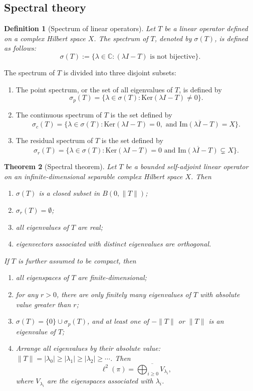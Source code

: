 \documentclass[a4]{amsart}
\newtheorem{theorem}{Theorem}
\newtheorem{definition}[theorem]{Definition}
\theoremstyle{remark} \newtheorem{remark}[theorem]{Remark}
\begin{document}
\subsection{Spectral theory}
\begin{definition}[Spectrum of linear operators]
Let $T$ be a linear operator defined on a complex Hilbert space $X$. The spectrum of $T$, denoted by $\sigma(T)$, is defined as follows:
\[
\sigma(T) := \{\lambda \in \mathbb{C} : (\lambda I - T) \text{ is not bijective}\}.
\]
\end{definition}
The spectrum of $T$ is divided into three disjoint subsets:
\begin{enumerate}
  \item[(a)] The point spectrum, or the set of all eigenvalues of $T$, is defined by
\[
\sigma_p(T)  = \{\lambda \in \sigma(T) : \mathrm{Ker}(\lambda I - T) \neq 0\}.
\]
  \item[(b)] The continuous spectrum of $T$ is the set defined by
\[
\sigma_c(T) = \{\lambda \in \sigma(T) : \mathrm{Ker}(\lambda I - T) = 0, \text{ and } \overline{\mathrm{Im}(\lambda I - T)} = X\}.
\]
  \item[(c)] The residual spectrum of $T$ is the set defined by
\[
\sigma_r(T) = \{\lambda \in \sigma(T) : \mathrm{Ker}(\lambda I - T) = 0 \text{ and } \overline{\mathrm{Im}(\lambda I - T)} \subsetneq X\}.
\]
\end{enumerate}

\begin{theorem}[Spectral theorem]
Let $T$ be a bounded self-adjoint linear operator on an infinite-dimensional separable complex Hilbert space $X$. Then
\begin{enumerate}
  \item [$(1)$] $\sigma(T)$ is a closed subset in $B(0, \|T\|)$;
  \item [$(2)$] $\sigma_r(T) = \emptyset$;
  \item [$(3)$] all eigenvalues of $T$ are real;
  \item [$(4)$] eigenvectors associated with distinct eigenvalues are orthogonal.
\end{enumerate}
If $T$ is further assumed to be compact, then
\begin{enumerate}
  \item [$(5)$] all eigenspaces of $T$ are finite-dimensional;
  \item [$(6)$] for any $r > 0$, there are only finitely many eigenvalues of $T$ with absolute value greater than $r$;
  \item [$(7)$] $\sigma(T) = \{0\} \cup \sigma_p(T)$, and at least one of $-\|T\|$ or $\|T\|$ is an eigenvalue of $T$;
  \item [$(8)$] Arrange all eigenvalues by their absolute value: $\|T\| = |\lambda_0| \geq |\lambda_1| \geq |\lambda_2| \geq \cdots$. Then
\[
\ell^2(\pi) = \overline{\bigoplus_{i \geq 0} V_{\lambda_i}},
\]
where $V_{\lambda_i}$ are the eigenspaces associated with $\lambda_i$.
\end{enumerate}
\end{theorem}
\end{document}

